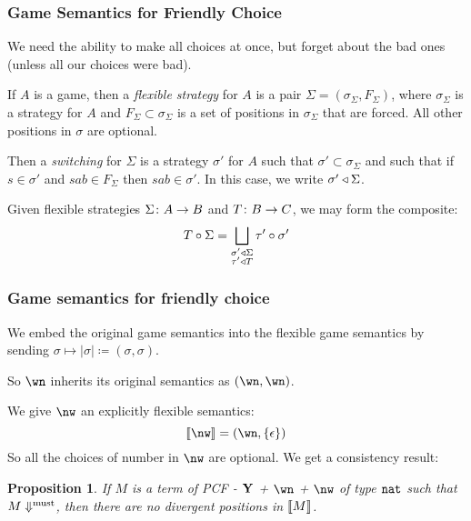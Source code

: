 \documentclass{beamer}
\newtheorem{proposition}{Proposition}
\begin{document}
\begin{frame}
  \frametitle{Game Semantics for Friendly Choice}
  \pause
  We need the ability to make all choices at once, but forget about the bad ones (unless all our choices were bad).  

  \pause
  If $A$ is a game, then a \emph{flexible strategy} for $A$ is a pair $\Sigma=(\sigma_\Sigma,F_\Sigma)$, where $\sigma_\Sigma$ is a strategy for $A$ and $F_\Sigma\subset\sigma_\Sigma$ is a set of positions in $\sigma_\Sigma$ that are forced.  All other positions in $\sigma$ are optional.

  \pause
  Then a \emph{switching} for $\Sigma$ is a strategy $\sigma'$ for $A$ such that $\sigma'\subset\sigma_\Sigma$ and such that if $s\in\sigma'$ and $sab\in F_{\Sigma}$ then $sab\in\sigma'$.  In this case, we write $\sigma'\triangleleft\Sigma$.

  \pause
  Given flexible strategies $\Sigma\colon A\to B$ and $T\colon B\to C$, we may form the composite:
  \[
    T \circ \Sigma = \bigsqcup_{\substack{\sigma'\triangleleft\Sigma\\\tau'\triangleleft T}}\tau' \circ \sigma'
    \]
\end{frame}

\begin{frame}
  \frametitle{Game semantics for friendly choice}
  \pause
  We embed the original game semantics into the flexible game semantics by sending $\sigma\mapsto|\sigma|\coloneqq(\sigma,\sigma)$.  

  \pause
  So $\wn$ inherits its original semantics as $(\wn, \wn)$.  

  \pause
  We give $\nw$ an explicitly flexible semantics:
  \[
    \deno{\nw} = (\wn, \{\emptyplay\})
    \]
  \pause
  So all the choices of number in $\nw$ are optional.  
  \pause
  We get a consistency result:
  \begin{proposition}
    If $M$ is a term of PCF - $\mathbf{Y}$ + $\wn$ + $\nw$ of type ${\mathtt{nat}}$ such that $M\Downarrow^{\text{must}}$, then there are no divergent positions in $\left\llbracket M\right\rrbracket$.  
  \end{proposition}
\end{frame}
\end{document}
